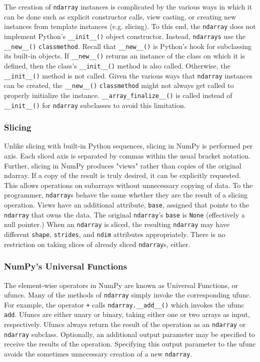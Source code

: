 \documentclass{sigplanconf}
\begin{document}
The creation of \verb=ndarray= instances is complicated by the various ways in
which it can be done such as explicit constructor calls, view casting, or
creating new instances from template instances (e.g. slicing). To this end,
the \verb=ndarray= does not implement Python’s \verb=__init__()= object
constructor.  Instead, \verb=ndarrays= use the \verb=__new__()=
\verb=classmethod=. Recall that \verb=__new__()= is Python’s hook for
subclassing its built-in objects. If \verb=__new__()= returns an instance of
the class on which it is defined, then the class's \verb=__init__()= method is
also called. Otherwise, the \verb=__init__()= method is not called. Given the
various ways that \verb=ndarray= instances can be created, the
\verb=__new__()= \verb=classmethod= might not always get called to properly
initialize the instance.  \verb=__array_finalize__()= is called instead of
\verb=__init__()= for \verb=ndarray= subclasses to avoid this limitation.

\subsubsection{Slicing}

Unlike slicing with built-in Python sequences, slicing in NumPy is performed
per axis. Each sliced axis is separated by commas within the usual bracket
notation. Further, slicing in NumPy produces "views" rather than copies of the
original ndarray. If a copy of the result is truly desired, it can be
explicitly requested. This allows operations on subarrays without unnecessary
copying of data. To the programmer, \texttt{ndarray}s behave the same whether
they are the result of a slicing operation. Views have an additional
attribute, \texttt{base}, assigned that points to the \texttt{ndarray} that
owns the data. The original \texttt{ndarray}’s \texttt{base} is \texttt{None}
(effectively a null pointer.) When an \texttt{ndarray} is sliced, the
resulting \texttt{ndarray} may have different \texttt{shape},
\texttt{strides}, and \texttt{ndim} attributes appropriately. There is no
restriction on taking slices of already sliced \texttt{ndarray}s, either.

\subsubsection{NumPy's Universal Functions}

The element-wise operators in NumPy are known as Universal Functions, or
ufuncs. Many of the methods of \verb=ndarray= simply invoke the corresponding
ufunc. For example, the operator \verb=+= calls \verb=ndarray.__add__()= which
invokes the ufunc \verb=add=. Ufuncs are either unary or binary, taking either
one or two arrays as input, respectively. Ufuncs always return the result of
the operation as an \verb=ndarray= or \verb=ndarray= subclass. Optionally, an
additional output parameter may be specified to receive the results of the
operation.  Specifying this output parameter to the ufunc avoids the sometimes
unnecessary creation of a new \verb=ndarray=.
\end{document}
